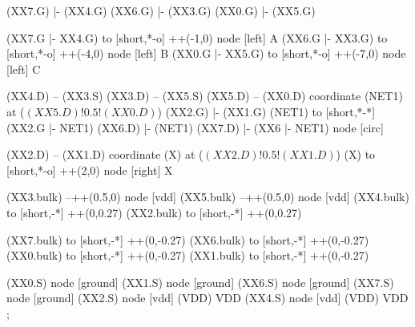 \begin{circuitikz}[american]
	
	(XX7.G) |- (XX4.G)
	(XX6.G) |- (XX3.G)
	(XX0.G) |- (XX5.G)
	
	(XX7.G |- XX4.G) to [short,*-o] ++(-1,0) node [left] {A}
	(XX6.G |- XX3.G) to [short,*-o] ++(-4,0) node [left] {B}
	(XX0.G |- XX5.G) to [short,*-o] ++(-7,0) node [left] {C}
	
	(XX4.D) -- (XX3.S)
	(XX3.D) -- (XX5.S)
	(XX5.D) -- (XX0.D)
	coordinate (NET1) at ($(XX5.D)!0.5!(XX0.D)$)
	(XX2.G) |- (XX1.G)
	(NET1) to [short,*-*] (XX2.G |- NET1) 
	(XX6.D) |- (NET1)
	(XX7.D) |- (XX6 |- NET1) node [circ] {} 
	
	(XX2.D) -- (XX1.D)
	coordinate (X) at ($(XX2.D)!0.5!(XX1.D)$)
	(X) to [short,*-o] ++(2,0) node [right] {X}
	
	(XX3.bulk) --++(0.5,0) node [vdd]{}
	(XX5.bulk) --++(0.5,0) node [vdd]{}
	(XX4.bulk) to [short,-*] ++(0,0.27)
	(XX2.bulk) to [short,-*] ++(0,0.27)
	
	(XX7.bulk) to [short,-*] ++(0,-0.27)
	(XX6.bulk) to [short,-*] ++(0,-0.27)
	(XX0.bulk) to [short,-*] ++(0,-0.27)
	(XX1.bulk) to [short,-*] ++(0,-0.27)
	

	(XX0.S) node [ground] {}
	(XX1.S) node [ground] {}
	(XX6.S) node [ground] {}
	(XX7.S) node [ground] {}
	(XX2.S) node [vdd] (VDD) {VDD}
	(XX4.S) node [vdd] (VDD) {VDD}
;

\end{circuitikz}
